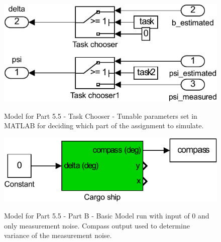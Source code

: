 \begin{subappendices}
\begin{figure}[h!]
\caption{Model for Part 5.5 - Task Chooser - Tunable parameters set in MATLAB for deciding which part of the assignment to simulate. }
	\centering
		\includegraphics[width=\textwidth]{images/simulink/ship_p5_task_chooser.pdf}
	\label{fig:ship_p5_task_chooser}
\end{figure}


\begin{figure}[h!]
\caption{Model for Part 5.5 - Part B - Basic Model run with input of 0 and only measurement noise. Compass output used to determine variance of the measurement noise.}
	\centering
		\includegraphics[width=\textwidth]{images/simulink/ship_p5b.pdf}
	\label{fig:ship_p5b}
\end{figure}



\end{subappendices}
